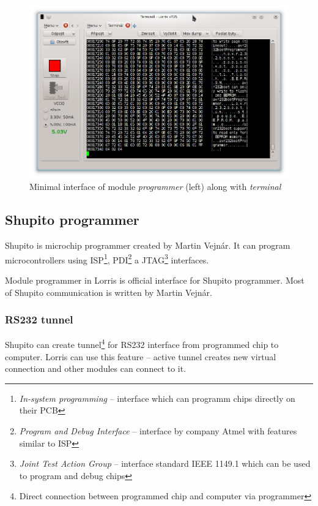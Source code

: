 \documentclass[12pt, a4paper, oneside]{article}
\newcommand{\It}{\textit}  %
\begin{document}
\begin{figure}[H]
\begin{center}
\includegraphics[width=\textwidth]{img/programmer_mini.png}
\caption{Minimal interface of module \It{programmer} (left) along with \It{terminal}}
\label{prog_mini}
\end{center}
\end{figure}

\subsection{Shupito programmer}
Shupito is microchip programmer created by Martin Vejnár. It can program microcontrollers using ISP\footnote{\It{In-system programming} -- interface which can programm chips directly on their PCB}, PDI\footnote{\It{Program and Debug Interface} -- interface by company Atmel with features similar to ISP} a JTAG\footnote{\It{Joint Test Action Group} -- interface standard IEEE 1149.1 which can be used to program and debug chips} interfaces.

Module programmer in Lorris is official interface for Shupito programmer. Most of Shupito communication is written by Martin Vejnár.

\subsubsection{RS232 tunnel}
\label{tunel}
Shupito can create tunnel\footnote{Direct connection between programmed chip and computer via programmer} for RS232 interface from programmed chip to computer. Lorris can use this feature -- active tunnel creates new virtual connection and other modules can connect to it.
\end{document}
